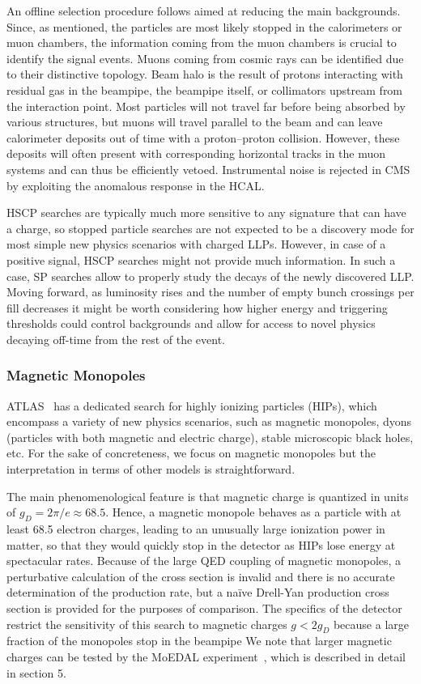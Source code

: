 An offline selection procedure follows aimed at reducing the main backgrounds. Since, as mentioned, the particles are most likely stopped in the calorimeters or muon chambers, the information coming from the muon chambers is crucial to identify the signal events.
Muons coming from cosmic rays can be identified due to their distinctive topology. Beam halo is the result of protons interacting with residual gas in the beampipe, the beampipe itself, or collimators upstream from the interaction point. Most particles will not travel far before being absorbed by various structures, but muons will travel parallel to the beam and can leave calorimeter deposits out of time with a proton--proton collision.
However, these deposits will often present with corresponding horizontal tracks in the muon systems and can thus be efficiently vetoed. Instrumental noise is rejected in CMS by exploiting the anomalous response in the HCAL.

HSCP searches are typically much more sensitive to any signature that can have a charge, so stopped particle searches are not expected to be a discovery mode for most simple new physics scenarios with charged LLPs. However, in case of a positive signal, HSCP searches might not provide much information. In such a case, SP searches allow to properly study the decays of the newly discovered LLP.
Moving forward, as luminosity rises and the number of empty bunch crossings per fill decreases it might be worth considering how higher energy and triggering thresholds could control backgrounds and allow for access to novel physics decaying off-time from the rest of the event.

\subsubsection{Magnetic Monopoles}

ATLAS~\cite{Aad:2015kta} has a dedicated search for highly ionizing particles (HIPs), which encompass a variety of new physics scenarios, such as magnetic monopoles, dyons (particles with both magnetic and electric charge), stable microscopic black holes, etc. For the sake of concreteness, we focus on magnetic monopoles but the interpretation in terms of other models is straightforward.

The main phenomenological feature is that magnetic charge is quantized in units of $g_D = 2\pi/e \approx 68.5$. Hence, a magnetic monopole behaves as a particle with at least 68.5 electron charges, leading to an unusually large ionization power in matter, so that they would quickly stop in the detector as HIPs lose energy at spectacular rates. Because of the large QED coupling of magnetic monopoles, a perturbative calculation of the cross section is invalid and there is no accurate determination of the production rate, but a na\"ive Drell-Yan production cross section is provided for the purposes of comparison. The specifics of the detector restrict the sensitivity of this search to magnetic charges $g < 2 g_D$ because a large fraction of the monopoles stop in the beampipe
We note that larger magnetic charges can be tested by the MoEDAL experiment~\cite{MoEDAL:2016jlb}, which is described in detail in section 5.

